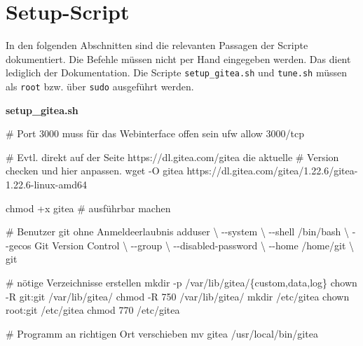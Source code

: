 \documentclass[
  letterpaper,
  DIV=11]{scrreprt}
\newenvironment{Shaded}{\begin{snugshade}}{\end{snugshade}}
\newcommand{\AttributeTok}[1]{\textcolor[rgb]{0.40,0.45,0.13}{#1}}
\newcommand{\CommentTok}[1]{\textcolor[rgb]{0.37,0.37,0.37}{#1}}
\newcommand{\DataTypeTok}[1]{\textcolor[rgb]{0.68,0.00,0.00}{#1}}
\newcommand{\ExtensionTok}[1]{\textcolor[rgb]{0.00,0.23,0.31}{#1}}
\newcommand{\FunctionTok}[1]{\textcolor[rgb]{0.28,0.35,0.67}{#1}}
\newcommand{\NormalTok}[1]{\textcolor[rgb]{0.00,0.23,0.31}{#1}}
\newcommand{\OperatorTok}[1]{\textcolor[rgb]{0.37,0.37,0.37}{#1}}
\newcommand{\StringTok}[1]{\textcolor[rgb]{0.13,0.47,0.30}{#1}}
\begin{document}
\section{Setup-Script}\label{setup-script}

In den folgenden Abschnitten sind die relevanten Passagen der Scripte
dokumentiert. Die Befehle müssen nicht per Hand eingegeben werden. Das
dient lediglich der Dokumentation. Die Scripte \texttt{setup\_gitea.sh}
und \texttt{tune.sh} müssen als \texttt{root} bzw. über \texttt{sudo}
ausgeführt werden.

\textbf{setup\_gitea.sh}

\begin{Shaded}
\begin{Highlighting}[]

\CommentTok{\# Port 3000 muss für das Webinterface offen sein}
\ExtensionTok{ufw}\NormalTok{ allow 3000/tcp}

\CommentTok{\# Evtl. direkt auf der Seite https://dl.gitea.com/gitea die aktuelle}
\CommentTok{\# Version checken  und hier anpassen.}
\FunctionTok{wget} \AttributeTok{{-}O}\NormalTok{ gitea https://dl.gitea.com/gitea/1.22.6/gitea{-}1.22.6{-}linux{-}amd64}

\FunctionTok{chmod}\NormalTok{ +x gitea  }\CommentTok{\# ausführbar machen}

\CommentTok{\# Benutzer git ohne Anmeldeerlaubnis}
\ExtensionTok{adduser} \DataTypeTok{\textbackslash{}}
   \AttributeTok{{-}{-}system} \DataTypeTok{\textbackslash{}}
   \AttributeTok{{-}{-}shell}\NormalTok{ /bin/bash }\DataTypeTok{\textbackslash{}}
   \AttributeTok{{-}{-}gecos} \StringTok{\textquotesingle{}Git Version Control\textquotesingle{}} \DataTypeTok{\textbackslash{}}
   \AttributeTok{{-}{-}group} \DataTypeTok{\textbackslash{}}
   \AttributeTok{{-}{-}disabled{-}password} \DataTypeTok{\textbackslash{}}
   \AttributeTok{{-}{-}home}\NormalTok{ /home/git }\DataTypeTok{\textbackslash{}}
\NormalTok{   git}

\CommentTok{\# nötige Verzeichnisse erstellen}
\FunctionTok{mkdir} \AttributeTok{{-}p}\NormalTok{ /var/lib/gitea/}\DataTypeTok{\{custom}\OperatorTok{,}\DataTypeTok{data}\OperatorTok{,}\DataTypeTok{log\}}
\FunctionTok{chown} \AttributeTok{{-}R}\NormalTok{ git:git /var/lib/gitea/}
\FunctionTok{chmod} \AttributeTok{{-}R}\NormalTok{ 750 /var/lib/gitea/}
\FunctionTok{mkdir}\NormalTok{ /etc/gitea}
\FunctionTok{chown}\NormalTok{ root:git /etc/gitea}
\FunctionTok{chmod}\NormalTok{ 770 /etc/gitea}

\CommentTok{\# Programm an richtigen Ort verschieben}
\FunctionTok{mv}\NormalTok{ gitea /usr/local/bin/gitea}


\end{Highlighting}
\end{Shaded}
\end{document}
